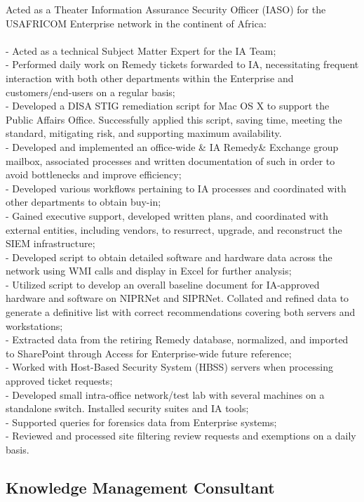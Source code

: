 \documentclass{article}
\begin{document}
{\noindent}Acted as a Theater Information Assurance Security Officer (IASO) for the USAFRICOM Enterprise network in the continent of Africa:\\\\- Acted as a technical Subject Matter Expert for the IA Team;\\- Performed daily work on Remedy tickets forwarded to IA, necessitating frequent interaction with both other departments within the Enterprise and customers/end-users on a regular basis;\\- Developed a DISA STIG remediation script for Mac OS X to support the Public Affairs Office. Successfully applied this script, saving time, meeting the standard, mitigating risk, and supporting maximum availability.\\- Developed and implemented an office-wide & IA Remedy&  Exchange group mailbox, associated processes and written documentation of such in order to avoid bottlenecks and improve efficiency;\\- Developed various workflows pertaining to IA processes and coordinated with other departments to obtain buy-in;\\- Gained executive support, developed written plans, and coordinated with external entities, including vendors, to resurrect, upgrade, and reconstruct the SIEM infrastructure;\\- Developed script to obtain detailed software and hardware data across the network using WMI calls and display in Excel for further analysis;\\- Utilized script to develop an overall baseline document for IA-approved hardware and software on NIPRNet and SIPRNet. Collated and refined data to generate a definitive list with correct recommendations covering both servers and workstations;\\- Extracted data from the retiring Remedy database, normalized, and imported to SharePoint through Access for Enterprise-wide future reference;\\- Worked with Host-Based Security System (HBSS) servers when processing approved ticket requests;\\- Developed small intra-office network/test lab with several machines on a standalone switch. Installed security suites and IA tools;\\- Supported queries for forensics data from Enterprise systems;\\- Reviewed and processed site filtering review requests and exemptions on a daily basis.
\\\subsection { Knowledge Management Consultant }
\end{document}
